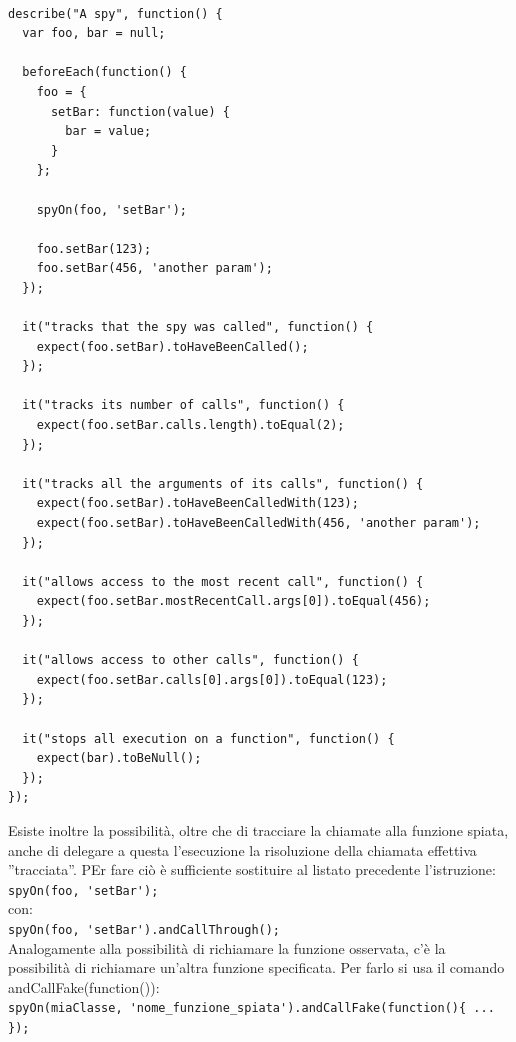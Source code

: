 \documentclass[10pt,a4paper,onecolumn]{article}
\begin{document}
\begin{lstlisting}

describe("A spy", function() {
  var foo, bar = null;

  beforeEach(function() {
    foo = {
      setBar: function(value) {
        bar = value;
      }
    };

    spyOn(foo, 'setBar');

    foo.setBar(123);
    foo.setBar(456, 'another param');
  });

  it("tracks that the spy was called", function() {
    expect(foo.setBar).toHaveBeenCalled();
  });

  it("tracks its number of calls", function() {
    expect(foo.setBar.calls.length).toEqual(2);
  });

  it("tracks all the arguments of its calls", function() {
    expect(foo.setBar).toHaveBeenCalledWith(123);
    expect(foo.setBar).toHaveBeenCalledWith(456, 'another param');
  });

  it("allows access to the most recent call", function() {
    expect(foo.setBar.mostRecentCall.args[0]).toEqual(456);
  });

  it("allows access to other calls", function() {
    expect(foo.setBar.calls[0].args[0]).toEqual(123);
  });

  it("stops all execution on a function", function() {
    expect(bar).toBeNull();
  });
});
\end{lstlisting}

Esiste inoltre la possibilità, oltre che di tracciare la chiamate alla funzione spiata, anche di delegare a questa l'esecuzione la risoluzione della chiamata effettiva ''tracciata''. PEr fare ciò è sufficiente sostituire al listato precedente l'istruzione:\\

\verb|spyOn(foo, 'setBar');|\\

con:\\

\verb|spyOn(foo, 'setBar').andCallThrough();|\\

Analogamente alla possibilità di richiamare la funzione osservata, c'è la possibilità di richiamare un'altra funzione specificata. Per farlo si usa il comando andCallFake(function(){}):\\

\verb|spyOn(miaClasse, 'nome_funzione_spiata').andCallFake(function(){ ... });|\\
\end{document}
